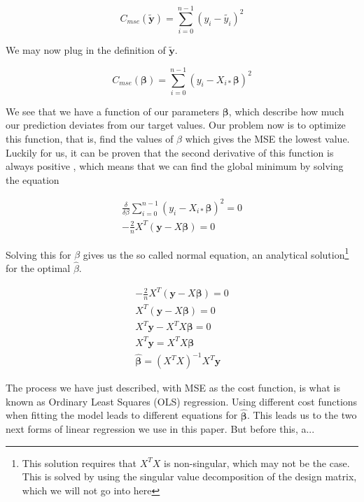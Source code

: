 \documentclass[twocolumn,10pt,cleanfoot]{asme2ej}
\begin{document}
\begin{equation}
	C_{mse}(\tilde{\bm{y}}) = \sum_{i=0}^{n-1}(y_i-\tilde{y_i})^2
\end{equation}

We may now plug in the definition of $\bm{\tilde{y}}$.

\begin{equation}
	C_{mse}(\bm{\beta}) = \sum_{i=0}^{n-1}(y_i-X_{i*}\bm{\beta})^2
\end{equation}

We see that we have a function of our parameters $\bm{\beta}$, which describe how much our prediction deviates from our target values. Our problem now is to optimize this function, that is, find the values of $\beta$ which gives the MSE the lowest value. Luckily for us, it can be proven that the second derivative of this function is always positive \cite[106]{linreg}, which means that we can find the global minimum by solving the equation

\begin{gather}
\frac{\delta}{\delta \beta} \sum_{i=0}^{n-1}(y_i-X_{i*}\bm{\beta})^2 = 0 \\
 - \frac{2}{n} X^T(\bm{y} - X\bm{\beta}) = 0
\end{gather}

Solving this for $\beta$ gives us the so called normal equation, an analytical solution\footnote{This solution requires that $X^TX$ is non-singular, which may not be the case. This is solved by using the singular value decomposition of the design matrix, which we will not go into here} for the optimal $\hat{\beta}$.

\begin{gather}
- \frac{2}{n} X^T(\bm{y} - X\bm{\beta}) = 0 \\
X^T(\bm{y} - X\bm{\beta}) = 0 \\
X^T\bm{y} - X^TX\bm{\beta} = 0 \\
X^T\bm{y} = X^TX\bm{\beta} \\
\bm{\hat{\beta}} = (X^TX)^{-1}X^T\bm{y}
\end{gather}

The process we have just described, with MSE as the cost function, is what is known as Ordinary Least Squares (OLS) regression. Using different cost functions when fitting the model leads to different equations for $\bm{\hat{\beta}}$. This leads us to the two next forms of linear regression we use in this paper. But before this, a...
\end{document}
